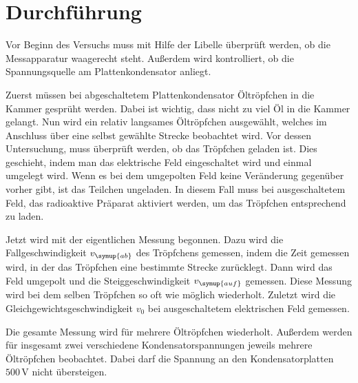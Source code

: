 \section{Durchführung}
\label{sec:Durchführung}

Vor Beginn des Versuchs muss mit Hilfe der Libelle überprüft werden, ob die Messapparatur 
waagerecht steht. Außerdem wird kontrolliert, ob die Spannungsquelle am Plattenkondensator 
anliegt.

Zuerst müssen bei abgeschaltetem Plattenkondensator Öltröpfchen in die Kammer gesprüht 
werden. Dabei ist wichtig, dass nicht zu viel Öl in die Kammer gelangt. Nun wird 
ein relativ langsames Öltröpfchen ausgewählt, welches im Anschluss über eine selbst 
gewählte Strecke beobachtet wird. Vor dessen Untersuchung, muss überprüft werden, ob das 
Tröpfchen geladen ist. Dies geschieht, indem man das elektrische Feld eingeschaltet 
wird und einmal umgelegt wird. Wenn es bei dem umgepolten Feld keine Veränderung gegenüber 
vorher gibt, ist das Teilchen ungeladen. In diesem Fall muss bei ausgeschaltetem 
Feld, das radioaktive Präparat aktiviert werden, um das Tröpfchen entsprechend zu 
laden. 

Jetzt wird mit der eigentlichen Messung begonnen. Dazu wird die Fallgeschwindigkeit $v_{\symup{ab}}$
des Tröpfchens gemessen, indem die Zeit gemessen wird, in der das Tröpfchen 
eine bestimmte Strecke zurücklegt. Dann wird das Feld umgepolt und die 
Steiggeschwindigkeit $v_{\symup{auf}}$ gemessen. Diese Messung wird bei dem selben 
Tröpfchen so oft wie möglich wiederholt. Zuletzt wird die Gleichgewichtsgeschwindigkeit 
$v_0$ bei ausgeschaltetem elektrischen Feld gemessen. 

Die gesamte Messung wird für mehrere Öltröpfchen wiederholt. Außerdem werden für insgesamt 
zwei verschiedene Kondensatorspannungen jeweils mehrere Öltröpfchen beobachtet.
Dabei darf die Spannung an den Kondensatorplatten $500\,\unit{\volt}$ nicht übersteigen.